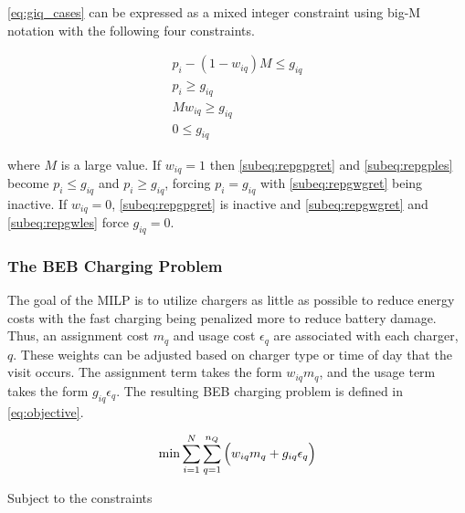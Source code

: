 \documentclass[11pt,a4paper,final]{article}
\begin{document}
\autoref{eq:giq_cases} can be expressed as a mixed integer constraint using big-M notation with the following four
constraints.

\begin{subequations}
    \label{eq:slack_gain}
\begin{align}
    p_i - (1 - w_{iq})M \leq g_{iq}  \label{subeq:repgpgret} \\
    p_i \geq g_{iq}                 \label{subeq:repgples} \\
    Mw_{iq} \geq g_{iq}              \label{subeq:repgwgret} \\
    0 \leq g_{iq}                   \label{subeq:repgwles}
\end{align}
\end{subequations}

\noindent
where \(M\) is a large value. If \(w_{iq} = 1\) then \autoref{subeq:repgpgret} and \autoref{subeq:repgples} become \(p_i \leq
g_{iq}\) and \(p_i \geq g_{iq}\), forcing \(p_i = g_{iq}\) with \autoref{subeq:repgwgret} being inactive. If \(w_{iq} = 0\),
\autoref{subeq:repgpgret} is inactive and \autoref{subeq:repgwgret} and \autoref{subeq:repgwles} force \(g_{iq} = 0\).

\subsubsection{The BEB Charging Problem} \label{sec:BEB_MILP}
The goal of the MILP is to utilize chargers as little as possible to reduce energy costs with the fast charging being
penalized more to reduce battery damage. Thus, an assignment cost \(m_q\) and usage cost \(\epsilon_q\) are associated with each
charger, \(q\). These weights can be adjusted based on charger type or time of day that the visit occurs. The assignment
term takes the form \(w_{iq}m_q\), and the usage term takes the form \(g_{iq} \epsilon_q\). The resulting BEB charging problem is
defined in \autoref{eq:objective}.

\begin{equation}
\label{eq:objective}
	\min \sum_{i=1}^N \sum_{q=1}^{n_Q} \Big( w_{iq} m_q + g_{iq} \epsilon_q \Big) \\
\end{equation}

Subject to the constraints
\end{document}
